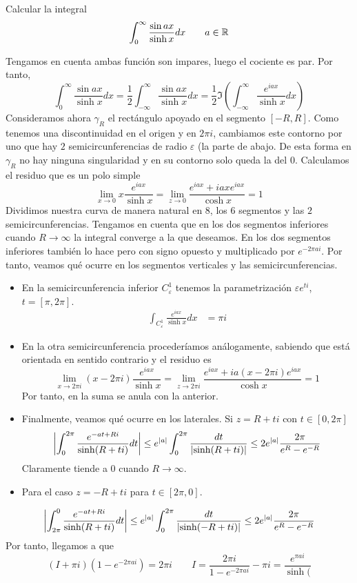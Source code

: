 \documentclass[twoside]{article}
\begin{document}
\begin{ejercicio}{4}
Calcular la integral
$$
\int_0^\infty \frac{\sin ax}{\sinh x}dx \qquad a \in \mathbb{R}
$$
\end{ejercicio}
\begin{solucion}
Tengamos en cuenta ambas función son impares, luego el cociente es par. Por tanto,
$$
\int_0^\infty \frac{\sin ax}{\sinh x}dx 
 = \frac{1}{2} \int_{-\infty}^\infty \frac{\sin ax}{\sinh x}dx = \frac{1}{2}\Im\left( \int_{-\infty}^\infty \frac{e^{iax}}{\sinh x}dx\right)
$$
Consideramos ahora $\gamma_R$ el rectángulo apoyado en el segmento $[-R,R]$. Como tenemos una discontinuidad en el origen y en $2\pi i$, cambiamos este contorno por uno que hay $2$ semicircunferencias de radio $\varepsilon$ (la parte de abajo. De esta forma en $\gamma_R$ no hay ninguna singularidad y en su contorno solo queda la del $0$. Calculamos el residuo que es un polo simple
$$
\lim_{x\to0}x\frac{e^{iax}}{\sinh x} = \lim_{z\to0}\frac{e^{iax}+iaxe^{iax}}{\cosh x} = 1
$$
Dividimos nuestra curva de manera natural en $8$, los $6$ segmentos y las $2$ semicircunferencias. Tengamos en cuenta que en los dos segmentos inferiores cuando $R\to \infty$ la integral converge a la que deseamos. En los dos segmentos inferiores también lo hace pero con signo opuesto y multiplicado por $e^{-2\pi a i}$. Por tanto, veamos qué ocurre en los segmentos verticales y las semicircunferencias.
\begin{itemize}
\item En la semicircunferencia inferior $C^1_\varepsilon$ tenemos la parametrización $\varepsilon e^{ti}$, $t=[\pi,2\pi]$.
\begin{align*}
\int_{C^1_\varepsilon} \frac{e^{iax}}{\sinh x}dx &=   \pi i
\end{align*}
\item En la otra semicircunferencia procederíamos análogamente, sabiendo que está orientada en sentido contrario y el residuo es
$$
\lim_{x\to 2\pi i}(x-2\pi i)\frac{e^{iax}}{\sinh x} = \lim_{z\to 2\pi i}\frac{e^{iax}+ia(x-2\pi i)e^{iax}}{\cosh x} = 1
$$
Por tanto, en la suma se anula con la anterior.
\item Finalmente, veamos qué ocurre en los laterales. Si $z=R +ti$ con $t\in [0,2\pi]$
\begin{align*}
\left\lvert\int_0^{2\pi} \frac{e^{-at+Ri}}{\sinh(R+ti)}dt\right\rvert \leq  e^{|a|}\int_0^{2\pi}\frac{dt}{\left\lvert\sinh(R+ti)\right\rvert} \leq 2e^{|a|}\frac{2\pi}{e^R-e^{-R}} 
\end{align*}
Claramente tiende a $0$ cuando $R\to \infty$.
\item Para el caso $z=-R+ti$ para $t\in[2\pi,0]$.
\end{itemize}
\begin{align*}
\left\lvert\int_{2\pi}^0 \frac{e^{-at+Ri}}{\sinh(R+ti)}dt\right\rvert \leq  e^{|a|}\int_0^{2\pi}\frac{dt}{\left\lvert\sinh(-R+ti)\right\rvert} \leq 2e^{|a|}\frac{2\pi}{e^R-e^{-R}} 
\end{align*}
Por tanto, llegamos a que
$$
(I+\pi i)(1-e^{-2\pi a i})=2\pi i \qquad I = \frac{2\pi i}{1-e^{-2\pi a i}}-\pi i = \frac{e^{\pi a i}}{\sinh(}
$$
\end{solucion}
\newpage
\end{document}
